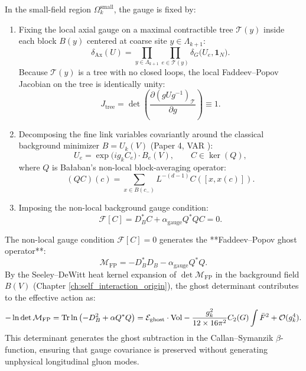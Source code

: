 In the small-field region $\Omega_k^{\mathrm{small}}$, the gauge is fixed by:
\begin{enumerate}
    \item Fixing the local axial gauge on a maximal contractible tree $\mathcal{T}(y)$ inside each block $B(y)$ centered at coarse site $y \in \Lambda_{k+1}$:
    \begin{equation}
    \delta_{\mathrm{Ax}}(U) = \prod_{y \in \Lambda_{k+1}} \prod_{e \in \mathcal{T}(y)} \delta_G\bigl( U_e, \mathbf{1}_N \bigr).
    \end{equation}
    Because $\mathcal{T}(y)$ is a tree with no closed loops, the local Faddeev--Popov Jacobian on the tree is identically unity:
    \begin{equation}
    J_{\mathrm{tree}} = \det\left( \frac{\partial (g U g^{-1})_{\mathcal{T}}}{\partial g} \right) \equiv 1.
    \end{equation}
    \item Decomposing the fine link variables covariantly around the classical background minimizer $B = U_k(V)$ (Paper 4, VAR \cite{Balaban1985c}):
    \begin{equation}
    U_e = \exp\bigl( i g_k C_e \bigr) \cdot B_e(V), \qquad C \in \ker(Q),
    \end{equation}
    where $Q$ is Ba\l aban's non-local block-averaging operator:
    \begin{equation}
    (QC)(c) = \sum_{x \in B(c_-)} L^{-(d-1)} C([x, x(c)]).
    \end{equation}
    \item Imposing the non-local background gauge condition:
    \begin{equation}
    \mathcal{F}[C] = D_B^* C + \alpha_{\mathrm{gauge}} Q^* Q C = 0.
    \end{equation}
\end{enumerate}

The non-local gauge condition $\mathcal{F}[C] = 0$ generates the **Faddeev--Popov ghost operator**:
\begin{equation}
\label{eq:ch14_ghost_operator_def}
\mathcal{M}_{\mathrm{FP}} = -D_B^* D_B - \alpha_{\mathrm{gauge}} Q^* Q.
\end{equation}
By the Seeley--DeWitt heat kernel expansion of $\det \mathcal{M}_{\mathrm{FP}}$ in the background field $B(V)$ (Chapter \ref{ch:self_interaction_origin}), the ghost determinant contributes to the effective action as:
\begin{equation}
\label{eq:ch14_ghost_det_expansion}
-\ln \det \mathcal{M}_{\mathrm{FP}} = \mathrm{Tr} \ln\left( -D_B^2 + \alpha Q^* Q \right) = \mathcal{E}_{\mathrm{ghost}} \cdot \mathrm{Vol} - \frac{g_k^2}{12 \times 16\pi^2} C_2(G) \int \bar{F}^2 + \mathcal{O}(g_k^4).
\end{equation}
This determinant generates the ghost subtraction in the Callan--Symanzik $\beta$-function, ensuring that gauge covariance is preserved without generating unphysical longitudinal gluon modes.

